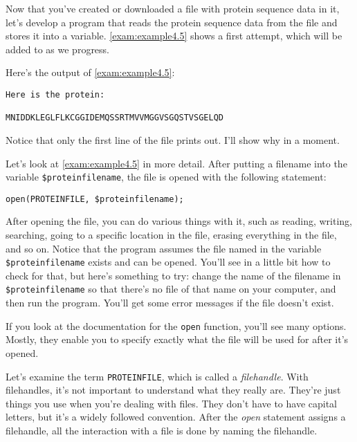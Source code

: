 Now that you've created or downloaded a file with protein sequence data in it, let's develop a program that reads the protein sequence data from the file and stores it into a variable. \autoref{exam:example4.5} shows a first attempt, which will be added to as we progress.



Here's the output of \autoref{exam:example4.5}:

\begin{lstlisting}
Here is the protein:

MNIDDKLEGLFLKCGGIDEMQSSRTMVVMGGVSGQSTVSGELQD
\end{lstlisting}

Notice that only the first line of the file prints out. I'll show why in a moment.

Let's look at \autoref{exam:example4.5} in more detail. After putting a filename into the variable \verb|$proteinfilename|, the file is opened with the following statement:

\begin{lstlisting}
open(PROTEINFILE, $proteinfilename);
\end{lstlisting}

After opening the file, you can do various things with it, such as reading, writing, searching, going to a specific location in the file, erasing everything in the file, and so on. Notice that the program assumes the file named in the variable \verb|$proteinfilename| exists and can be opened. You'll see in a little bit how to check for that, but here's something to try: change the name of the filename in \verb|$proteinfilename| so that there's no file of that name on your computer, and then run the program. You'll get some error messages if the file doesn't exist.

If you look at the documentation for the \verb|open| function, you'll see many options. Mostly, they enable you to specify exactly what the file will be used for after it's opened.

Let's examine the term \verb|PROTEINFILE|, which is called a \textit{filehandle}. With filehandles, it's not important to understand what they really are. They're just things you use when you're dealing with files. They don't have to have capital letters, but it's a widely followed convention. After the \textit{open} statement assigns a filehandle, all the interaction with a file is done by naming the filehandle.  

